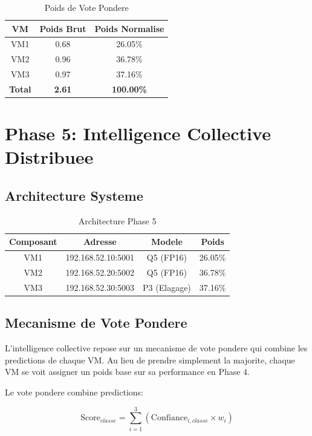 \documentclass[12pt,a4paper]{report}
\begin{document}
\begin{table}[H]
\centering
\begin{tabular}{|c|c|c|}
\hline
\textbf{VM} & \textbf{Poids Brut} & \textbf{Poids Normalise} \\
\hline
VM1 & 0.68 & 26.05\% \\
VM2 & 0.96 & 36.78\% \\
VM3 & 0.97 & 37.16\% \\
\hline
\textbf{Total} & \textbf{2.61} & \textbf{100.00\%} \\
\hline
\end{tabular}
\caption{Poids de Vote Pondere}
\end{table}

\chapter{Phase 5: Intelligence Collective Distribuee}

\section{Architecture Systeme}

\begin{table}[H]
\centering
\begin{tabular}{|c|c|c|c|}
\hline
\textbf{Composant} & \textbf{Adresse} & \textbf{Modele} & \textbf{Poids} \\
\hline
VM1 & 192.168.52.10:5001 & Q5 (FP16) & 26.05\% \\
VM2 & 192.168.52.20:5002 & Q5 (FP16) & 36.78\% \\
VM3 & 192.168.52.30:5003 & P3 (Elagage) & 37.16\% \\
\hline
\end{tabular}
\caption{Architecture Phase 5}
\end{table}

\section{Mecanisme de Vote Pondere}

L'intelligence collective repose sur un mecanisme de vote pondere qui combine les predictions de chaque VM. Au lieu de prendre simplement la majorite, chaque VM se voit assigner un poids base sur sa performance en Phase 4.

Le vote pondere combine predictions:

$$\text{Score}_{classe} = \sum_{i=1}^{3} (\text{Confiance}_{i,classe} \times w_i)$$
\end{document}
